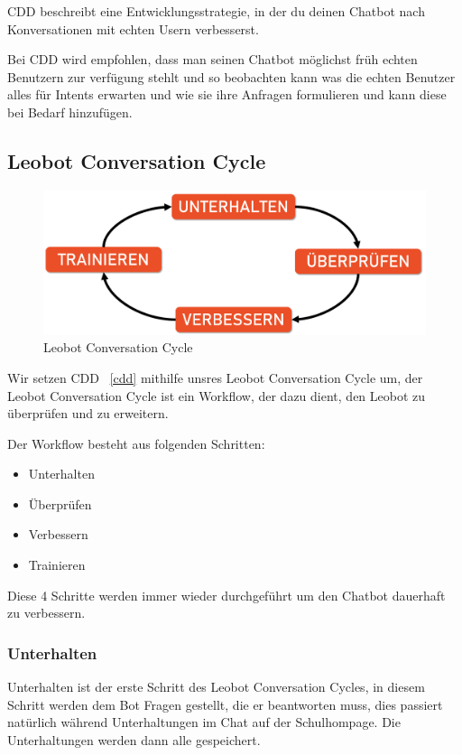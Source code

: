 CDD beschreibt eine Entwicklungsstrategie, in der du deinen Chatbot nach Konversationen mit echten Usern verbesserst.

Bei CDD wird empfohlen, dass man seinen Chatbot möglichst früh echten Benutzern zur verfügung stehlt und so beobachten kann was die echten Benutzer alles für Intents erwarten und wie sie ihre Anfragen formulieren und kann diese bei Bedarf hinzufügen.



\subsection{Leobot Conversation Cycle}

\begin{figure}[hbt!]
    \centering
    \includegraphics[scale=0.2]{pics/LeoCircle}
    \caption{Leobot Conversation Cycle}
    \label{fig:impl:ConversationCycle}
\end{figure}

Wir setzen CDD ~\ref{cdd} mithilfe unsres Leobot Conversation Cycle um, der Leobot Conversation Cycle ist ein Workflow, der dazu dient, den Leobot zu überprüfen und zu erweitern.

Der Workflow besteht aus folgenden Schritten:

\begin{itemize}
    \item Unterhalten
    \item Überprüfen
    \item Verbessern
    \item Trainieren
\end{itemize}

Diese 4 Schritte werden immer wieder durchgeführt um den Chatbot dauerhaft zu verbessern.

\subsubsection{Unterhalten}
Unterhalten ist der erste Schritt des Leobot Conversation Cycles, in diesem Schritt werden dem Bot Fragen gestellt, die er beantworten muss, dies passiert natürlich während Unterhaltungen im Chat auf der Schulhompage.
Die Unterhaltungen werden dann alle gespeichert.

